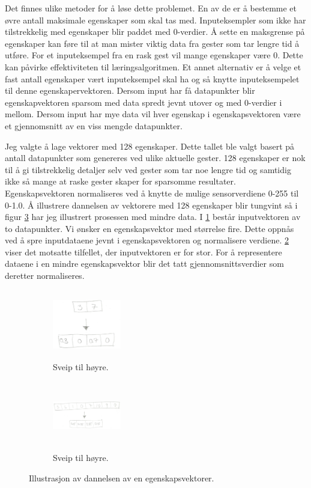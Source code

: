 Det finnes ulike metoder for å løse dette problemet. En av de er å bestemme et øvre antall maksimale egenskaper som skal tas med. Inputeksempler som ikke har tilstrekkelig med egenskaper blir paddet med 0-verdier. Å sette en maksgrense på egenskaper kan føre til at man mister viktig data fra gester som tar lengre tid å utføre. For et inputeksempel fra en rask gest vil mange egenskaper være 0. Dette kan påvirke effektiviteten til læringsalgoritmen. Et annet alternativ er å velge et fast antall egenskaper vært inputeksempel skal ha og så knytte inputeksempelet til denne egenskapervektoren. Dersom input har få datapunkter blir egenskapvektoren sparsom med data spredt jevnt utover og med 0-verdier i mellom. Dersom input har mye data vil hver egenskap i egenskapsvektoren være et gjennomsnitt av en viss mengde datapunkter.

Jeg valgte å lage vektorer med 128 egenskaper. Dette tallet ble valgt basert på antall datapunkter som genereres ved ulike aktuelle gester. 128 egenskaper er nok til å gi tilstrekkelig detaljer selv ved gester som tar noe lengre tid og samtidig ikke så mange at raske gester skaper for sparsomme resultater. Egenskapsvektoren normaliseres ved å knytte de mulige sensorverdiene 0-255 til 0-1.0. Å illustrere dannelsen av vektorere med 128 egenskaper blir tungvint så i figur \ref{fig:data} har jeg illustrert prosessen med mindre data. I \ref{fig:few} består inputvektoren av to datapunkter. Vi ønsker en egenskapsvektor med størrelse fire. Dette oppnås ved å spre inputdataene jevnt i egenskapsvektoren og normalisere verdiene. \ref{fig:many} viser det motsatte tilfellet, der inputvektoren er for stor. For å representere dataene i en mindre egenskapsvektor blir det tatt gjennomsnittsverdier som deretter normaliseres. 

\begin{figure}[h]
\centering
\begin{subfigure}{0.23\textwidth}
\includegraphics[width=3cm, height=3cm]{fig/few-to-many}
\caption{Sveip til høyre.}
\label{fig:few}
\end{subfigure}
\begin{subfigure}{0.23\textwidth}
\includegraphics[width=3cm, height=3cm]{fig/many-to-few}
\caption{Sveip til høyre.}
\label{fig:many}
\end{subfigure}
\caption{Illustrasjon av dannelsen av en egenskapsvektorer.}
\label{fig:data}
\end{figure}

